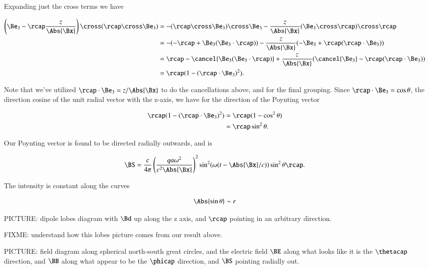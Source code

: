 Expanding just the cross terms we have

\begin{align*}
\left( \Be_3 - \rcap \frac{z}{\Abs{\Bx}} \right) \cross (\rcap \cross \Be_3)
&=
-(\rcap \cross \Be_3) \cross \Be_3 - \frac{z}{\Abs{\Bx}} (\Be_3 \cross \rcap) \cross \rcap \\
&=
-(-\rcap + \Be_3(\Be_3 \cdot \rcap) ) - \frac{z}{\Abs{\Bx}} (-\Be_3 + \rcap (\rcap \cdot \Be_3)) \\
&=
\rcap - \cancel{\Be_3(\Be_3 \cdot \rcap)} + \frac{z}{\Abs{\Bx}} (\cancel{\Be_3} - \rcap (\rcap \cdot \Be_3)) \\
&=
\rcap( 1 - (\rcap \cdot \Be_3)^2 ).
\end{align*}

Note that we've utilized $\rcap \cdot \Be_3 = z/\Abs{\Bx}$ to do the cancellations above, and for the final grouping.  Since $\rcap \cdot \Be_3 = \cos\theta$, the direction cosine of the unit radial vector with the z-axis, we have for the direction of the Poynting vector

\begin{align*}
\rcap( 1 - (\rcap \cdot \Be_3)^2 )
&= \rcap (1 - \cos^2\theta) \\
&= \rcap \sin^2\theta.
\end{align*}

Our Poynting vector is found to be directed radially outwards, and is

\begin{equation}\label{eqn:relativisticElectrodynamicsL21:180}
\BS =
\frac{c}{4 \pi}
\left( \frac{q a \omega^2}{c^2 \Abs{\Bx} } \right)^2
\sin^2(\omega (t - \Abs{\Bx}/c)) \sin^2\theta \rcap.
\end{equation}

The intensity is constant along the curves

\begin{equation}\label{eqn:relativisticElectrodynamicsL21:200}
\Abs{\sin\theta} \sim r
\end{equation}

PICTURE: dipole lobes diagram with $\Bd$ up along the z axis, and $\rcap$ pointing in an arbitrary direction.

FIXME: understand how this lobes picture comes from our result above.

PICTURE: field diagram along spherical north-south great circles, and the electric field $\BE$ along what looks like it is the $\thetacap$ direction, and $\BB$ along what appear to be the $\phicap$ direction, and $\BS$ pointing radially out.

